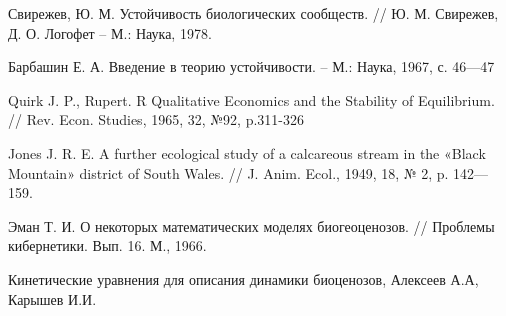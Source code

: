 \renewcommand{\refname}{\centering Список литературы}
\begin{thebibliography}{100}
    
        Свирежев, Ю. М. Устойчивость биологических сообществ. // Ю. М. Свирежев, Д. О. Логофет -- М.: Наука, 1978.

        Барбашин Е. А. Введение в теорию устойчивости. -- М.: Наука, 1967, с. 46—47

        Quirk J. P., Rupert. R Qualitative Economics and the Stability of Equilibrium. // Rev. Econ. Studies, 1965, 32, №92, p.311-326

        Jones J. R. E. A further ecological study of a calcareous stream in the «Black Mountain» district of South Wales. // J. Anim. Ecol., 1949, 18, № 2, p. 142—159.

        Эман Т. И. О некоторых математических моделях биогеоценозов. // Проблемы кибернетики. Вып. 16. М., 1966.

        Кинетические уравнения для описания динамики биоценозов, Алексеев А.А, Карышев И.И. %

\end{thebibliography}
